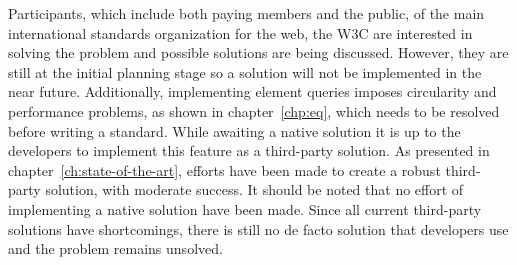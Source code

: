 \documentclass[a4paper,11pt]{kth-mag}
\begin{document}
      Participants, which include both paying members and the public, of the main international standards organization for the \gls{web}, the \gls{W3C} are interested in solving the problem and possible solutions are being discussed.
      However, they are still at the initial planning stage \cite{ricg_site} so a solution will not be implemented  in the near future.
      Additionally, implementing element queries imposes circularity and performance problems, as shown in chapter~\ref{chp:eq}, which needs to be resolved before writing a standard.
      While awaiting a \gls{native} solution it is up to the developers to implement this feature as a \gls{third-party} solution.
      As presented in chapter~\ref{ch:state-of-the-art}, efforts have been made to create a robust \gls{third-party} solution, with moderate success.
      It should be noted that no effort of implementing a native solution have been made.
      Since all current \gls{third-party} solutions have shortcomings, there is still no de facto solution that developers use and the problem remains unsolved.
\end{document}
